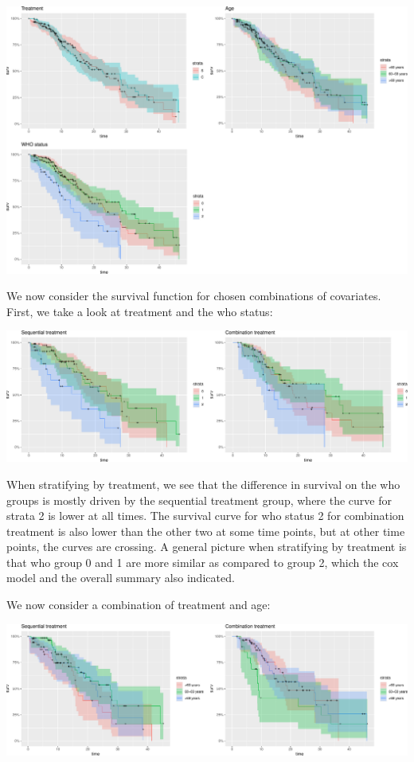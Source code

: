 \documentclass[
  11pt,
]{article}
\begin{document}
\includegraphics{Exam2021_files/figure-latex/unnamed-chunk-7-1.pdf}

We now consider the survival function for chosen combinations of
covariates. First, we take a look at treatment and the who status:

\includegraphics{Exam2021_files/figure-latex/unnamed-chunk-8-1.pdf}

When stratifying by treatment, we see that the difference in survival on
the who groups is mostly driven by the sequential treatment group, where
the curve for strata 2 is lower at all times. The survival curve for who
status 2 for combination treatment is also lower than the other two at
some time points, but at other time points, the curves are crossing. A
general picture when stratifying by treatment is that who group 0 and 1
are more similar as compared to group 2, which the cox model and the
overall summary also indicated.

We now consider a combination of treatment and age:

\includegraphics{Exam2021_files/figure-latex/unnamed-chunk-9-1.pdf}
\end{document}
